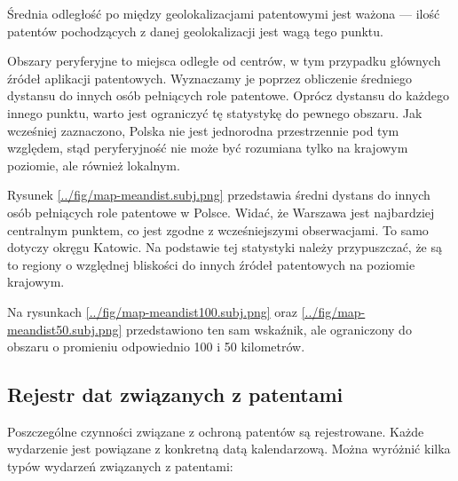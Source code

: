 \begin{multicols}{2}


\begin{uwaga}
Średnia odległość po między geolokalizacjami patentowymi jest ważona ---
ilość patentów pochodzących z danej geolokalizacji jest wagą tego punktu.
\end{uwaga}

\end{multicols}

Obszary peryferyjne to miejsca odległe od centrów, w tym przypadku
głównych źródeł aplikacji patentowych. Wyznaczamy je poprzez obliczenie
średniego dystansu do innych osób pełniących role patentowe.
Oprócz dystansu do każdego innego punktu, warto jest ograniczyć
tę statystykę do pewnego obszaru. Jak wcześniej zaznaczono, Polska
nie jest jednorodna przestrzennie pod tym względem, stąd peryferyjność
nie może być rozumiana tylko na krajowym poziomie, ale również lokalnym.

Rysunek \ref{../fig/map-meandist.subj.png} przedstawia średni dystans
do innych osób pełniących role patentowe w Polsce. Widać, że Warszawa
jest najbardziej centralnym punktem, co jest zgodne z wcześniejszymi
obserwacjami. To samo dotyczy okręgu Katowic. Na podstawie tej statystyki 
należy przypuszczać, że są to regiony o względnej bliskości 
do innych źródeł patentowych na poziomie krajowym.

Na rysunkach \ref{../fig/map-meandist100.subj.png} oraz
\ref{../fig/map-meandist50.subj.png} przedstawiono ten sam
wskaźnik, ale ograniczony do obszaru o promieniu odpowiednio 100 i 50 kilometrów.



\subsection{Rejestr dat związanych z patentami}

Poszczególne czynności związane z ochroną patentów są rejestrowane.
Każde wydarzenie jest powiązane z konkretną datą kalendarzową.
Można wyróżnić kilka typów wydarzeń związanych z patentami:


